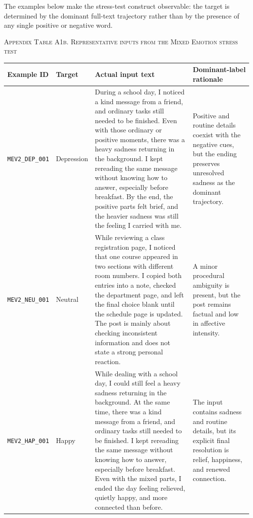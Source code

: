 \documentclass{ieeeaccess}
\begin{document}
The examples below make the stress-test construct observable: the target is determined by the dominant full-text trajectory rather than by the presence of any single positive or negative word.

\noindent\textsc{Appendix Table A1b. Representative inputs from the Mixed Emotion stress test}\par
\label{tab:appendix-a1b-mixed-examples}
\smallskip
\small
\setlength{\tabcolsep}{4pt}
\renewcommand{\arraystretch}{1.18}
\noindent\begin{tabularx}{\textwidth}{@{}>{\raggedright\arraybackslash}p{}>{\raggedright\arraybackslash}p{}>{\raggedright\arraybackslash}p{}Y@{}}
\toprule
Example ID & Target & Actual input text & Dominant-label rationale \\
\midrule
\texttt{MEV2\_DEP\_001} & Depression & During a school day, I noticed a kind message from a friend, and ordinary tasks still needed to be finished. Even with those ordinary or positive moments, there was a heavy sadness returning in the background. I kept rereading the same message without knowing how to answer, especially before breakfast. By the end, the positive parts felt brief, and the heavier sadness was still the feeling I carried with me. & Positive and routine details coexist with the negative cues, but the ending preserves unresolved sadness as the dominant trajectory. \\
\texttt{MEV2\_NEU\_001} & Neutral & While reviewing a class registration page, I noticed that one course appeared in two sections with different room numbers. I copied both entries into a note, checked the department page, and left the final choice blank until the schedule page is updated. The post is mainly about checking inconsistent information and does not state a strong personal reaction. & A minor procedural ambiguity is present, but the post remains factual and low in affective intensity. \\
\texttt{MEV2\_HAP\_001} & Happy & While dealing with a school day, I could still feel a heavy sadness returning in the background. At the same time, there was a kind message from a friend, and ordinary tasks still needed to be finished. I kept rereading the same message without knowing how to answer, especially before breakfast. Even with the mixed parts, I ended the day feeling relieved, quietly happy, and more connected than before. & The input contains sadness and routine details, but its explicit final resolution is relief, happiness, and renewed connection. \\
\bottomrule
\end{tabularx}
\par\smallskip
\normalsize
\end{document}
